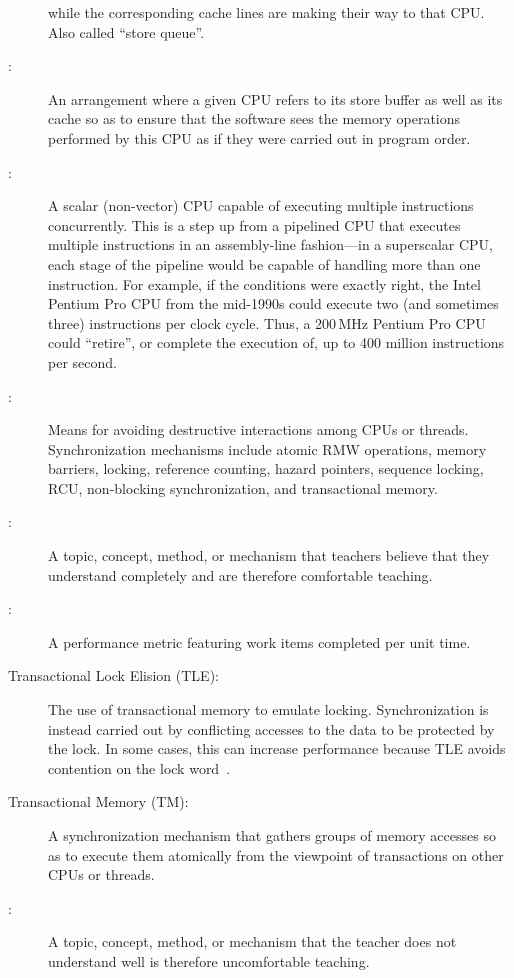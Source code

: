 \begin{description}
	while the corresponding cache lines are making their
	way to that CPU\@.
	Also called ``store queue''.
\item[\IX{Store Forwarding}:]
	An arrangement where a given CPU refers to its store buffer
	as well as its cache so as to ensure that the software sees
	the memory operations performed by this CPU as if they
	were carried out in program order.
\item[\IXr{Superscalar CPU}:]
	A scalar (non-vector) CPU capable of executing multiple instructions
	concurrently.
	This is a step up from a pipelined CPU that executes multiple
	instructions in an assembly-line fashion---in a superscalar
	CPU, each stage of the pipeline would be capable of handling
	more than one instruction.
	For example, if the conditions were exactly right,
	the Intel Pentium Pro CPU from the mid-1990s could
	execute two (and sometimes three) instructions per clock cycle.
	Thus, a 200\,MHz Pentium Pro CPU could ``retire'', or complete the
	execution of, up to 400 million instructions per second.
\item[\IX{Synchronization}:]
	Means for avoiding destructive interactions among CPUs or threads.
	Synchronization mechanisms include atomic RMW operations, memory
	barriers, locking, reference counting, hazard pointers, sequence
	locking, RCU, non-blocking synchronization, and transactional
	memory.
\item[\IX{Teachable}:]
	A topic, concept, method, or mechanism that teachers believe that
	they understand completely and are therefore comfortable teaching.
\item[\IX{Throughput}:]
	A performance metric featuring work items completed per unit time.
\item[Transactional Lock Elision (TLE):]
	The use of transactional memory to emulate locking.
	Synchronization is instead carried out by conflicting accesses
	to the data to be protected by the lock.
	In some cases, this can increase performance because TLE
	avoids contention on the lock
	word~\cite{MartinPohlack2011HTM2TLE,Kleen:2014:SEL:2566590.2576793,PascalFelber2016rwlockElision,SeongJaePark2020HTMRCUlock}.
\item[Transactional Memory (TM):]
	A synchronization mechanism that gathers groups of memory
	accesses so as to execute them atomically from the viewpoint
	of transactions on other CPUs or threads.
\item[\IX{Unteachable}:]
	A topic, concept, method, or mechanism that the teacher does
	not understand well is therefore uncomfortable teaching.

\end{description}

